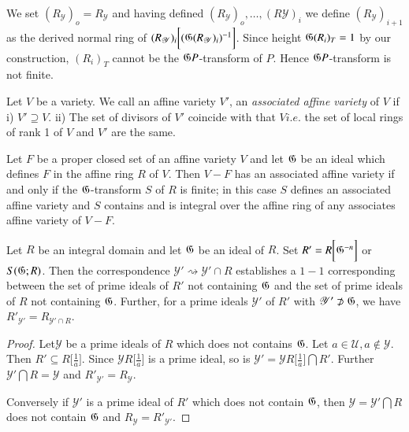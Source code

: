  We set $(R_\mathscr{Y})_o = R_\mathscr{Y}$ and having defined
 $(R_\mathscr{Y})_o ,\ldots,(R \mathscr{Y})_i$ we define
 $(R_\mathscr{Y})_{i+1}$ as the derived normal ring of
 $(R_\mathscr{Y})_i  \bigg [(\mathfrak{G}(R_\mathscr{Y})_i)^{-1}\bigg ]$.  
 Since height $\mathfrak{G}(R_i)_T =1$ by our construction, $(R_i)_T$
 cannot be the $\mathfrak{G} P$-transform of $P$. Hence
 $\mathfrak{G} P$-transform is not finite. 
 
\medskip
{} 
   
 Let $V$ be a variety. We call an affine variety $V'$, an
 \textit{associated affine variety}  of $V$ if i) $V' \supseteq V$.
 ii) The set of divisors of $V'$ coincide with that $V i.e.$ the set of
 local rings of rank 1 of $V$ and $V'$ are the same. 
    
\begin{thm}\label{chap5:thm2} %
  Let $F$ be a proper closed set of an affine variety $V$ and 
  let $\mathfrak{G}$ be an ideal which defines $F$ in the affine ring
  $R$ of $V$. Then $V-F$ has an associated affine variety if and only
  if the $\mathfrak{G}$-transform $S$ of $R$ is finite; in this case $S$
  defines an associated affine variety and $S$ contains and is integral
  over the affine ring of any associates affine variety of $V-F$. 
 \end{thm}
 
\setcounter{lem}{0}
\begin{lem}\label{chap5:lem1}%
  Let $R$ be an integral domain and let $\mathfrak{G}$ be an ideal of
  $R$. Set $R'=R \bigg [\mathfrak{G}^{-n}\bigg ]$ or $S(\mathfrak{G};R)$. Then
  the correspondence $\mathscr{Y'}\rightsquigarrow \mathscr{Y'}\cap R$
  establishes a $1-1$ corresponding between the set of prime ideals of
  $R'$ not containing $\mathfrak{G}$ and the set of prime ideals of $R$
  not containing $\mathfrak{G}$. Further, for a prime ideals
  $\mathscr{Y'}$ of $R'$ with $\mathscr{Y'}\not\supset \mathfrak{G}$, we
  have $ R'_\mathscr{Y'} = R_{\mathscr{Y'} \cap R}$. 
\end{lem} 

\begin{proof}
  Let\pageoriginale $\mathscr{Y}$  be a prime ideals of $R$ which does
  not contains 
  $\mathfrak{G}$. Let $a \in \mathscr{U}, a \notin \mathscr{Y}$. Then
  $R' \subseteq R \bigg[\frac{1}{a} \bigg ]$. Since $\mathscr{Y} R
  \bigg[\frac{1}{a} \bigg ]$ is a prime ideal, so is $\mathscr{Y'}=
  \mathscr{Y} R \bigg[\frac{1}{a} \bigg ] \bigcap R'$. Further
  $\mathscr{Y'} \bigcap R = \mathscr{Y}$ and $R'_\mathscr{Y'}=
  R_\mathscr{Y} $. 

  Conversely if $\mathscr{Y'}$ is a prime ideal of $R'$  which does
  not contain $\mathfrak{G}$, then $\mathscr{Y}=\mathscr{Y'} \bigcap
  R$ does not contain $\mathfrak{G}$ and $R_\mathscr{Y}=R'_\mathscr{Y'}$. 
\end{proof}

